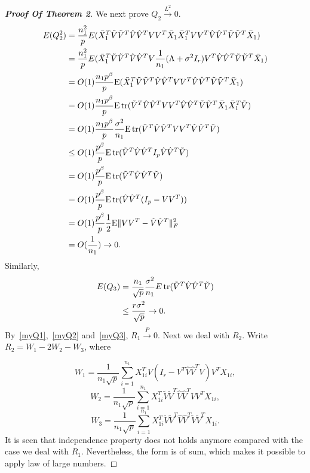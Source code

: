 \begin{proof}[\textbf{Proof Of Theorem 2}]
We next prove $Q_2\xrightarrow{L^2}0$.
\begin{align}
        E(Q_2^2)&=\frac{n_1^2}{p}E(\bar{X}_1^T \tilde{V} \tilde{V}^T \hat{V}\hat{V}^T VV^T \bar{X}_1\bar{X}_1^T VV^T \hat{V}\hat{V}^T \tilde{V}\tilde{V}^T \bar{X}_1)\label{myQ2}\\
        &=\frac{n_1^2}{p}E(\bar{X}_1^T \tilde{V} \tilde{V}^T \hat{V}\hat{V}^T V\frac{1}{n_1}(\Lambda+\sigma^2I_r)V^T \hat{V}\hat{V}^T \tilde{V}\tilde{V}^T \bar{X}_1)\notag\\
        &=O(1)\frac{n_1p^{\beta}}{p}\mathrm{E}(\bar{X}_1^T \tilde{V} \tilde{V}^T \hat{V}\hat{V}^T VV^T \hat{V}\hat{V}^T \tilde{V}\tilde{V}^T \bar{X}_1)\notag\\
        &=O(1)\frac{n_1p^{\beta}}{p}\mathrm{E}\, \mathrm{tr}(\tilde{V}^T \hat{V}\hat{V}^T VV^T \hat{V}\hat{V}^T \tilde{V}\tilde{V}^T \bar{X}_1\bar{X}_1^T \tilde{V} )\notag\\
        &=O(1)\frac{n_1p^{\beta}}{p}\frac{\sigma^2}{n_1}\mathrm{E}\, \mathrm{tr}(\tilde{V}^T \hat{V}\hat{V}^T VV^T \hat{V}\hat{V}^T \tilde{V})\notag\\
        &\leq O(1)\frac{p^{\beta}}{p}\mathrm{E}\, \mathrm{tr}(\tilde{V}^T \hat{V}\hat{V}^T I_p \hat{V}\hat{V}^T \tilde{V})\notag\\
        &= O(1)\frac{p^{\beta}}{p}\mathrm{E}\, \mathrm{tr}(\tilde{V}^T \hat{V}\hat{V}^T \tilde{V})\notag\\
        &= O(1)\frac{p^{\beta}}{p}\mathrm{E}\, \mathrm{tr}( \hat{V}\hat{V}^T (I_p-VV^T ))\notag\\
        &= O(1)\frac{p^{\beta}}{p}\frac{1}{2}\mathrm{E}\|VV^T -\hat{V}\hat{V}^T \|_F^2\notag\\
        &= O(\frac{1}{n_1})\to 0.\notag
\end{align}
Similarly,
\begin{align}
        E(Q_3)&=\frac{n_1}{\sqrt{p}}\frac{\sigma^2}{n_1}E\, \mathrm{tr}(\tilde{V}^T \hat{V}\hat{V}^T \tilde{V})\label{myQ3}\\
        &\leq \frac{r\sigma^2}{\sqrt{p}}\to 0.   \notag
\end{align}
By~\eqref{myQ1},~\eqref{myQ2} and~\eqref{myQ3}, $R_1\xrightarrow{P}0$. Next we deal with $R_2$. Write $R_2=W_1-2W_2-W_3$, where

    \begin{equation*}
        W_1=\frac{1}{n_1\sqrt{p}}\sum_{i=1}^{n_1}X_{1i}^T V(I_r-V^T\hat{V}\hat{V}^T V)V^T X_{1i},
    \end{equation*}
    \begin{equation*}
        W_2=\frac{1}{n_1\sqrt{p}}\sum_{i=1}^{n_1}X_{1i}^T \tilde{V}\tilde{V}^T\hat{V}\hat{V}^T VV^T X_{1i},
    \end{equation*}
    \begin{equation*}
        W_3=\frac{1}{n_1\sqrt{p}}\sum_{i=1}^{n_1}X_{1i}^T \tilde{V}\tilde{V}^T\hat{V}\hat{V}^T \tilde{V}\tilde{V}^T X_{1i}.
    \end{equation*}
It is seen that independence property does not holds anymore compared with the case we deal with $R_1$. Nevertheless, the form is of sum, which makes it possible to apply law of large numbers.


\end{proof}
